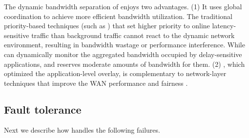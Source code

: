 The dynamic bandwidth separation of \name enjoys two advantages. (1) It uses global coordination to achieve more efficient bandwidth utilization. The traditional priority-based techniques (such as \cite{kumar2015bwe}) that set higher priority to online latency-sensitive traffic than background traffic cannot react to the dynamic network environment, resulting in bandwidth wastage or performance interference. While \name can dynamically monitor the aggregated bandwidth occupied by delay-sensitive applications, and reserves moderate amounts of bandwidth for them.
(2) \name, which optimized the application-level overlay, is complementary to network-layer techniques that improve the WAN performance and fairness \cite{chen2012design, kavulya2010analysis, mishra2010towards, reiss2012heterogeneity}.




\subsection{Fault tolerance}
\label{subsec:system:fault}
Next we describe how \name handles the following failures.

